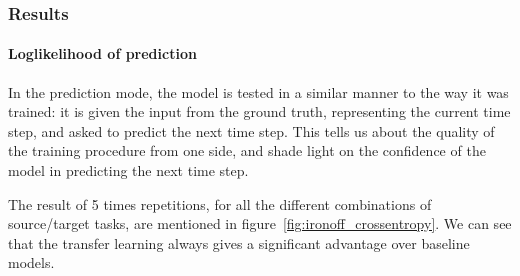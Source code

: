     \subsubsection{Results}
    \paragraph{Loglikelihood of prediction}
      In the prediction mode, the model is tested in a similar manner to the way it was trained: it is given the input from the ground truth, representing the current time step, and asked to predict the next time step. This tells us about the quality of the training procedure from one side, and shade light on the confidence of the model in predicting the next time step.

      The result of 5 times repetitions, for all the different combinations of source/target tasks, are mentioned in figure~\ref{fig:ironoff_crossentropy}. We can see that the transfer learning always gives a significant advantage over baseline models.
